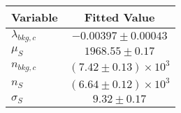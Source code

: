 \begin{tabular}[t]{lc}
\hline
Variable &Fitted Value\\
\hline\hline
$\lambda_{bkg,c}$&$-0.00397\pm0.00043$\\
\hline
$\mu_{S}$&$1968.55\pm0.17$\\
\hline
$n_{bkg,c}$&$(7.42\pm0.13)\times 10^3$\\
\hline
$n_{S}$&$(6.64\pm0.12)\times 10^3$\\
\hline
$\sigma_{S}$&$9.32\pm0.17$\\
\hline
\end{tabular}
